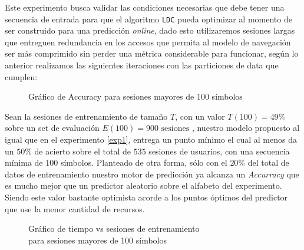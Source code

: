 Este experimento busca validar las condiciones necesarias que debe tener una secuencia de entrada para que el algoritmo \texttt{LDC} pueda optimizar al momento de ser construido para una predicción \emph{online}, dado esto utilizaremos sesiones largas que entreguen redundancia en los accesos que permita al modelo de navegación ser más comprimido sin perder una métrica considerable para funcionar, según lo anterior realizamos las siguientes iteraciones con las particiones de data que cumplen: 
	
	\begin{figure}[h] 
		\centering
		\caption{Gráfico de Accuracy para sesiones mayores de 100 símbolos}
		\label{fig:sim}
	\end{figure}
	
	
	Sean la sesiones de entrenamiento de tamaño $T$, con un valor  $T(100) = 49 \% $ sobre un set de evaluación $E(100) = 900 \mbox{ sesiones}$ , nuestro modelo propuesto al igual que en el experimento \ref{exp1}, entrega un punto mínimo el cual al menos da un $50\%$ de acierto sobre el total de $535$ sesiones de usuarios, con una secuencia mínima de $100$ símbolos. Planteado de otra forma, sólo con el $20\%$ del total de datos de entrenamiento nuestro motor de predicción ya alcanza un \emph{Accurracy} que es mucho mejor que un predictor aleatorio sobre el alfabeto del experimento. Siendo este valor bastante optimista acorde a los puntos óptimos del predictor que use la menor cantidad de recursos.
	
	
	\begin{figure}[h] \label{fig:sim}
	\centering
		\caption{Gráfico de tiempo vs sesiones de entrenamiento\\ para sesiones mayores de 100 símbolos}
		
	\end{figure}


